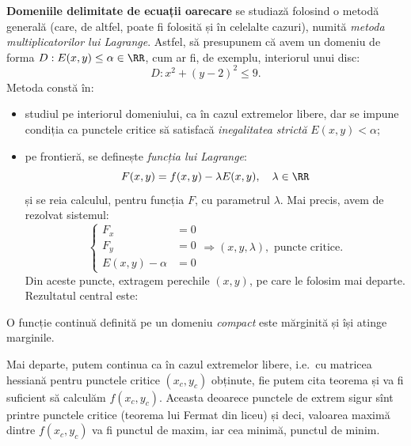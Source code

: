 \textbf{Domeniile delimitate de ecuații oarecare} se studiază folosind o metodă
generală (care, de altfel, poate fi folosită și în celelalte cazuri), numită
\emph{metoda multiplicatorilor lui Lagrange}. Astfel, să presupunem că
avem un domeniu de forma $ D : E(x, y) \leq \alpha \in \RR$, cum ar fi, de exemplu,
interiorul unui disc:
\[
  D : x^2 + (y - 2)^2 \leq 9.
\]
Metoda constă în:
\begin{itemize}
\item studiul pe interiorul domeniului, ca în cazul extremelor libere,
  dar se impune condiția ca punctele critice să satisfacă
  \emph{inegalitatea strictă} $ E(x, y) < \alpha $;
\item pe frontieră, se definește \emph{funcția lui Lagrange}:
  \[
    F(x, y) = f(x, y) - \lambda E(x, y), \quad \lambda \in \RR
  \]
  și se reia calculul, pentru funcția $ F $, cu parametrul $ \lambda $. Mai precis,
  avem de rezolvat sistemul:
  \[
    \begin{cases}
      F_x &= 0 \\
      F_y &= 0 \\
      E(x, y) - \alpha &= 0
    \end{cases} \Longrightarrow (x, y, \lambda), \text{ puncte critice.}
  \]
  Din aceste puncte, extragem perechile $ (x, y) $, pe care le folosim
  mai departe. Rezultatul central este:
\end{itemize}

\begin{theorem}\label{thm:functie-marg}
  O funcție continuă definită pe un domeniu \emph{compact}\footnotemark
  este mărginită și își atinge mar\-gi\-ni\-le.
\end{theorem}


Mai departe, putem continua ca în cazul extremelor libere, i.e.\ cu matricea hessiană
pentru punctele critice $ (x_c, y_c) $ obținute, fie putem cita teorema și va fi
suficient să calculăm $ f(x_c, y_c) $. Aceasta deoarece punctele de extrem
sigur sînt printre punctele critice (teorema lui Fermat din liceu) și deci,
valoarea maximă dintre $ f(x_c, y_c) $ va fi punctul de maxim, iar cea
minimă, punctul de minim.

